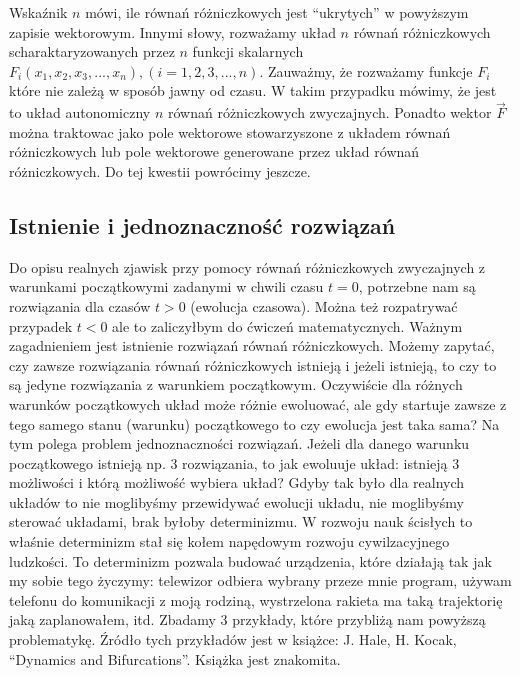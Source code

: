 \documentclass[a4paper,12pt,polish]{sphinxmanual}
\begin{document}
Wskaźnik $n$ mówi, ile równań różniczkowych jest ``ukrytych'' w powyższym zapisie wektorowym. Innymi słowy, rozważamy układ $n$ równań różniczkowych scharaktaryzowanych przez $n$ funkcji skalarnych $F_i(x_1, x_2, x_3, ..., x_n), (i=1,2,3, ..., n)$. Zauważmy, że rozważamy funkcje $F_i$ które nie zależą w sposób jawny od czasu. W takim przypadku mówimy, że jest to układ autonomiczny $n$ równań  różniczkowych zwyczajnych. Ponadto wektor $\vec F$ można traktowac jako pole wektorowe stowarzyszone z układem równań różniczkowych lub pole wektorowe generowane przez układ równań różniczkowych. Do tej kwestii powrócimy jeszcze.


\subsection{Istnienie i jednoznaczność rozwiązań}
\label{ch1/chI021:istnienie-i-jednoznacznosc-rozwiazan}
Do opisu  realnych zjawisk przy pomocy równań różniczkowych zwyczajnych z warunkami początkowymi zadanymi w chwili  czasu $t=0$, potrzebne nam są rozwiązania dla czasów $t>0$ (ewolucja czasowa).  Można też rozpatrywać przypadek $t<0$ ale to zaliczyłbym do ćwiczeń matematycznych.  Ważnym zagadnieniem jest istnienie rozwiązań równań różniczkowych. Możemy zapytać, czy zawsze rozwiązania równań różniczkowych istnieją i jeżeli istnieją, to czy to są jedyne rozwiązania z warunkiem początkowym. Oczywiście dla różnych warunków początkowych układ może różnie ewoluować, ale gdy startuje  zawsze z tego samego  stanu (warunku) początkowego to czy ewolucja jest taka sama? Na tym polega problem jednoznaczności rozwiązań. Jeżeli dla danego warunku początkowego istnieją  np. 3 rozwiązania, to jak ewoluuje układ: istnieją 3 możliwości i którą możliwość wybiera układ? Gdyby tak było dla realnych układów to nie moglibyśmy przewidywać ewolucji układu, nie moglibyśmy sterować układami, brak byłoby determinizmu.  W rozwoju nauk ścisłych to właśnie determinizm stał się kołem napędowym rozwoju cywilzacyjnego ludzkości. To determinizm pozwala budować urządzenia, które działają tak jak my sobie tego życzymy: telewizor odbiera wybrany przeze mnie program, używam telefonu do komunikacji  z moją rodziną, wystrzelona rakieta ma taką trajektorię jaką zaplanowałem, itd.  Zbadamy 3 przykłady, które przybliżą nam powyższą problematykę. Źródło tych przykładów jest w  książce: J. Hale, H. Kocak, ``Dynamics and Bifurcations''. Książka jest znakomita.
\end{document}
